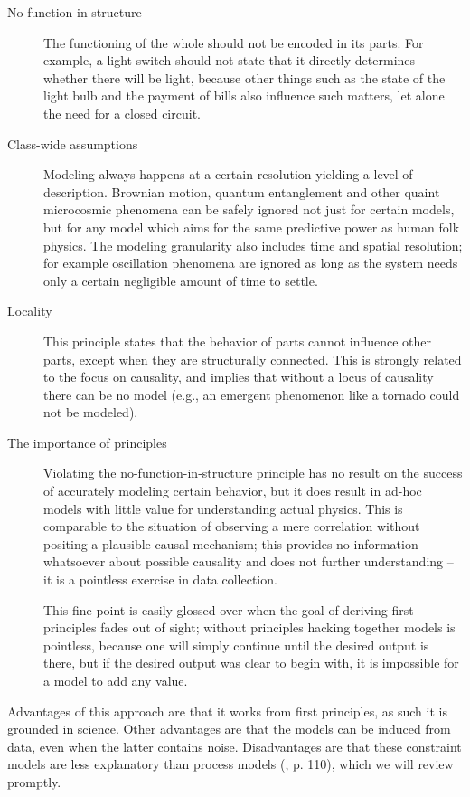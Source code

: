 \documentclass{article} %
\begin{document}
\begin{description}
	\item[No function in structure]
		The functioning of the whole should not be encoded in its
		parts. For example, a light switch should not state that it
		directly determines whether there will be light, because other
		things such as the state of the light bulb and the payment of
		bills also influence such matters, let alone the need for a
		closed circuit.

	\item[Class-wide assumptions]
		Modeling always happens at a certain resolution yielding a
		level of description. Brownian motion, quantum entanglement
		and other quaint microcosmic phenomena can be safely ignored
		not just for certain models, but for any model which aims for
		the same predictive power as human folk physics. The modeling
		granularity also includes time and spatial resolution; for
		example oscillation phenomena are ignored as long as the system
		needs only a certain negligible amount of time to settle.
	
	\item[Locality]
		This principle states that the behavior of parts cannot
		influence other parts, except when they are structurally
		connected. This is strongly related to the focus on causality,
		and implies that without a locus of causality there can be no
		model (e.g., an emergent phenomenon like a tornado could not be
		modeled).

	\item[The importance of principles]
		Violating the no-function-in-structure principle has no result
		on the success of accurately modeling certain behavior, but it
		does result in ad-hoc models with little value for
		understanding actual physics. This is comparable to the
		situation of observing a mere correlation without positing a
		plausible causal mechanism; this provides no information
		whatsoever about possible causality and does not further
		understanding -- it is a pointless exercise in data collection.

		This fine point is easily glossed over when the goal of
		deriving first principles fades out of sight; without
		principles hacking together models is pointless, because one
		will simply continue until the desired output is there, but if
		the desired output was clear to begin with, it is impossible
		for a model to add any value.
\end{description}

Advantages of this approach are that it works from first principles, as such it
is grounded in science. Other advantages are that the models can be induced
from data, even when the latter contains noise. Disadvantages are that these
constraint models are less explanatory than process models (\cite{forbus}, p.
110), which we will review promptly.
\end{document}
